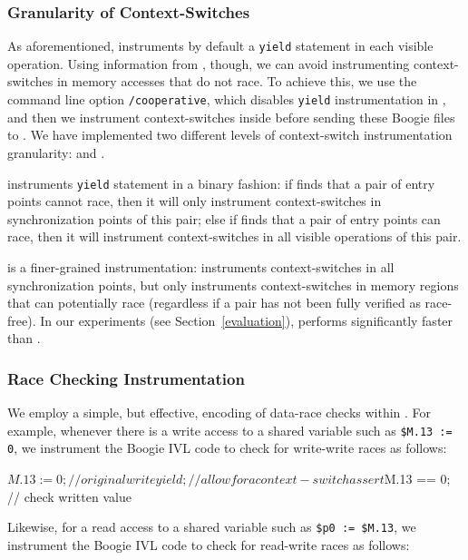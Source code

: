 \subsubsection{Granularity of Context-Switches}
\label{bf:granularity}

As aforementioned, \corral instruments by default a \texttt{yield} statement in
each visible operation. Using information from \whoop, though, we can avoid
instrumenting context-switches in memory accesses that do not race. To achieve
this, we use the \corral command line option \texttt{/cooperative}, which
disables \texttt{yield} instrumentation in \corral, and then we instrument
context-switches inside \whoop before sending these Boogie files to \corral. We
have implemented two different levels of context-switch instrumentation
granularity: \emph{\yieldcoarse} and \emph{\yieldmr}.

\yieldcoarse instruments \texttt{yield} statement in a binary fashion: if \whoop
finds that a pair of entry points cannot race, then it will only instrument
context-switches in synchronization points of this pair; else if \whoop finds
that a pair of entry points can race, then it will instrument context-switches
in all visible operations of this pair.

\yieldmr is a finer-grained instrumentation: \whoop instruments context-switches
in all synchronization points, but only instruments context-switches in memory
regions that can potentially race (regardless if a pair has not been fully
verified as race-free). In our experiments (see Section~\ref{evaluation}),
\yieldmr performs significantly faster than \yieldcoarse.

\subsubsection{Race Checking Instrumentation}
\label{bf:racechecking}

We employ a simple, but effective, encoding of data-race checks within \corral.
For example, whenever there is a write access to a shared variable such as
\texttt{\$M.13 := 0}, we instrument the Boogie IVL code to check for write-write
races as follows:
%
\begin{boogie}
$M.13 := 0;        // original write
yield;             // allow for a context-switch
assert $M.13 == 0; // check written value
\end{boogie}
%
Likewise, for a read access to a shared variable such as \texttt{\$p0 :=
\$M.13}, we instrument the Boogie IVL code to check for read-write races as
follows:
%

